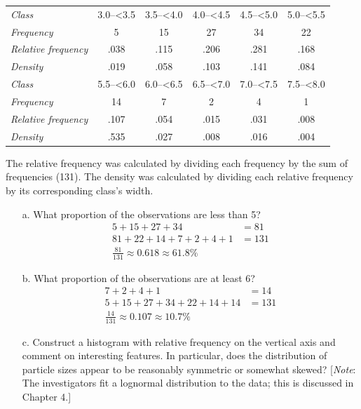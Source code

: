 \documentclass[letterpaper,12pt]{article}
\begin{document}
\begin{enumerate}
    \begin{center}
      \begin{tabular}{>{\itshape}l c c c c c}
        Class & 3.0--<3.5 & 3.5--<4.0 & 4.0--<4.5 & 4.5--<5.0 & 5.0--<5.5 \\
        Frequency & 5 & 15 & 27 & 34 & 22 \\
        Relative frequency & .038 & .115 & .206 & .281 & .168 \\
        Density & .019 & .058 & .103 & .141 & .084 \\
        \hline
        Class & 5.5--<6.0 & 6.0--<6.5 & 6.5--<7.0 &  7.0--<7.5 & 7.5--<8.0 \\
        Frequency & 14 & 7 & 2 & 4 & 1 \\
        Relative frequency & .107 & .054 & .015 & .031 & .008 \\
        Density & .535 & .027 & .008 & .016 & .004
      \end{tabular}
    \end{center}
    The relative frequency was calculated by dividing each frequency by the sum of frequencies (131). The density was calculated by dividing each relative frequency by its corresponding class's width.
    \begin{enumerate}
      \item[a.]
        What proportion of the observations are less than 5?
        \begin{align*}
          5 + 15 + 27 + 34 &= 81 \\
          81 + 22 + 14 + 7 + 2 + 4 + 1 &= 131 \\
          \frac{81}{131} \approx 0.618 \approx 61.8\%
        \end{align*}
      \item[b.]
        What proportion of the observations are at least 6?
        \begin{align*}
          7 + 2 + 4 + 1 &= 14 \\
          5 + 15 + 27 + 34 + 22 + 14 + 14 &= 131 \\
          \frac{14}{131} \approx 0.107 \approx 10.7\%
        \end{align*}
      \item[c.]
        Construct a histogram with relative frequency on the vertical axis and comment on interesting features. In particular, does the distribution of particle sizes appear to be reasonably symmetric or somewhat skewed? [\textit{Note}: The investigators fit a lognormal distribution to the data; this is discussed in Chapter 4.]

\end{enumerate}
\end{enumerate}
\end{document}

